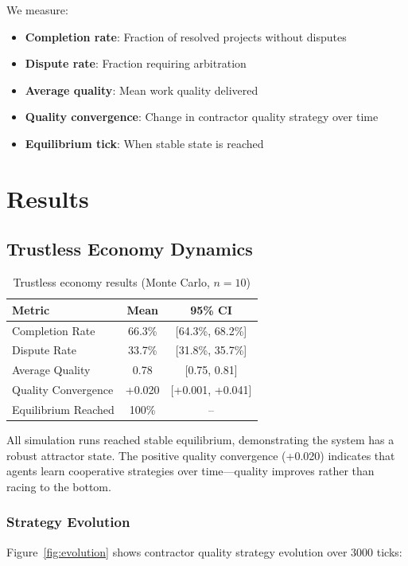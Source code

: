 \documentclass[11pt,a4paper]{article}
\begin{document}
We measure:
\begin{itemize}
    \item \textbf{Completion rate}: Fraction of resolved projects without disputes
    \item \textbf{Dispute rate}: Fraction requiring arbitration
    \item \textbf{Average quality}: Mean work quality delivered
    \item \textbf{Quality convergence}: Change in contractor quality strategy over time
    \item \textbf{Equilibrium tick}: When stable state is reached
\end{itemize}

\section{Results}

\subsection{Trustless Economy Dynamics}

\begin{table}[H]
\centering
\caption{Trustless economy results (Monte Carlo, $n=10$)}
\label{tab:trustless}
\begin{tabular}{lcc}
\toprule
Metric & Mean & 95\% CI \\
\midrule
Completion Rate & 66.3\% & [64.3\%, 68.2\%] \\
Dispute Rate & 33.7\% & [31.8\%, 35.7\%] \\
Average Quality & 0.78 & [0.75, 0.81] \\
Quality Convergence & +0.020 & [+0.001, +0.041] \\
Equilibrium Reached & 100\% & -- \\
\bottomrule
\end{tabular}
\end{table}

All simulation runs reached stable equilibrium, demonstrating the system has a robust attractor state. The positive quality convergence (+0.020) indicates that agents learn cooperative strategies over time---quality improves rather than racing to the bottom.

\subsubsection{Strategy Evolution}

Figure~\ref{fig:evolution} shows contractor quality strategy evolution over 3000 ticks:
\end{document}
